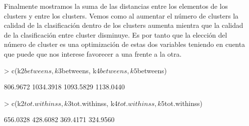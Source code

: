 \documentclass [a4paper] {article}
\begin{document}
Finalmente mostramos la suma de las distancias entre los elementos de los clusters y entre los clusters.
Vemos como al aumentar el número de clusters la calidad de la clasificación dentro de los clusters aumenta mientra que la calidad de la clasificación entre cluster disminuye.
Es por tanto que la elección del número de cluster es una optimización de estas dos variables teniendo en cuenta que puede que nos interese favorecer a una frente a la otra.
\begin{Schunk}
\begin{Sinput}
> c(k2$betweens, k3$betweens, k4$betweens, k5$betweens)
\end{Sinput}
\begin{Soutput}
[1]  806.9672 1034.3918 1093.5829 1138.0440
\end{Soutput}
\begin{Sinput}
> c(k2$tot.withinss, k3$tot.withinss, k4$tot.withinss, k5$tot.withinss)
\end{Sinput}
\begin{Soutput}
[1] 656.0328 428.6082 369.4171 324.9560
\end{Soutput}
\end{Schunk}

\newpage
\end{document}
